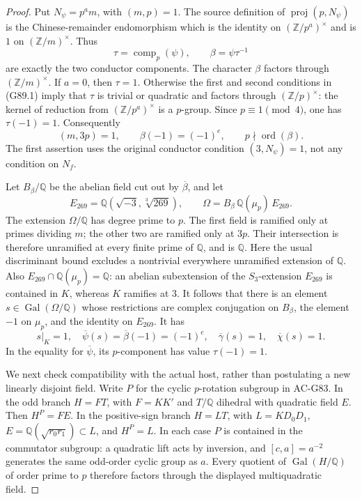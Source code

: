 \begin{proof}
Put \(N_\psi=p^a m\), with \((m,p)=1\).
The source definition of \(\operatorname{proj}(p,N_\psi)\)
is the Chinese-remainder endomorphism which is the identity on
\((\mathbb Z/p^a)^\times\) and is \(1\) on
\((\mathbb Z/m)^\times\).  Thus
\[
 \tau=\operatorname{comp}_p(\psi),\qquad
 \beta=\psi\tau^{-1}                               \tag{G89.4}
\]
are exactly the two conductor components.
The character \(\beta\) factors through \((\mathbb Z/m)^\times\).
If \(a=0\), then \(\tau=1\).
Otherwise the first and second conditions in (G89.1) imply that
\(\tau\) is trivial or quadratic and factors through
\((\mathbb Z/p)^\times\): the kernel of reduction from
\((\mathbb Z/p^a)^\times\) is a \(p\)-group.
Since \(p\equiv1\pmod4\), one has \(\tau(-1)=1\).
Consequently
\[
 (m,3p)=1,\qquad
 \beta(-1)=(-1)^e,\qquad
 p\nmid\operatorname{ord}(\beta).                  \tag{G89.5}
\]
The first assertion uses the original conductor condition
\((3,N_\psi)=1\), not any condition on \(N_f\).

Let \(B_\beta/\mathbb Q\) be the abelian field cut out by
\(\overline\beta\), and let
\[
 E_{269}=\mathbb Q(\sqrt{-3},\sqrt[3]{269}),\qquad
 \Omega=B_\beta\,\mathbb Q(\mu_p)\,E_{269}.          \tag{G89.6}
\]
The extension \(\Omega/\mathbb Q\) has degree prime to \(p\).
The first field is ramified only at primes dividing \(m\);
the other two are ramified only at \(3p\).
Their intersection is therefore unramified at every finite prime
of \(\mathbb Q\), and is \(\mathbb Q\).
Here the usual discriminant bound excludes a nontrivial everywhere
unramified extension of \(\mathbb Q\).
Also \(E_{269}\cap\mathbb Q(\mu_p)=\mathbb Q\):
an abelian subextension of the \(S_3\)-extension \(E_{269}\) is
contained in \(K\), whereas \(K\) ramifies at \(3\).
It follows that there is an element \(s\in\operatorname{Gal}(\Omega/\mathbb Q)\)
whose restrictions are complex conjugation on \(B_\beta\),
the element \(-1\) on \(\mu_p\), and the identity on \(E_{269}\).
It has
\[
 s|_K=1,\quad
 \overline\psi(s)=\overline\beta(-1)=(-1)^e,\quad
 \overline\gamma(s)=1,\quad \overline\chi(s)=1.     \tag{G89.7}
\]
In the equality for \(\overline\psi\), its \(p\)-component has
value \(\tau(-1)=1\).

We next check compatibility with the actual host, rather than
postulating a new linearly disjoint field.
Write \(P\) for the cyclic \(p\)-rotation subgroup in AC-G83.
In the odd branch \(H=FT\), with \(F=KK'\) and
\(T/\mathbb Q\) dihedral with quadratic field \(E\).
Then \(H^P=FE\).
In the positive-sign branch \(H=LT\), with
\(L=KD_0D_1\), \(E=\mathbb Q(\sqrt{r_0r_1})\subset L\),
and \(H^P=L\).
In each case \(P\) is contained in the commutator subgroup:
a quadratic lift acts by inversion, and
\([c,a]=a^{-2}\) generates the same odd-order cyclic group as \(a\).
Every quotient of \(\operatorname{Gal}(H/\mathbb Q)\) of order
prime to \(p\) therefore factors through the displayed
multiquadratic field.


\end{proof}
